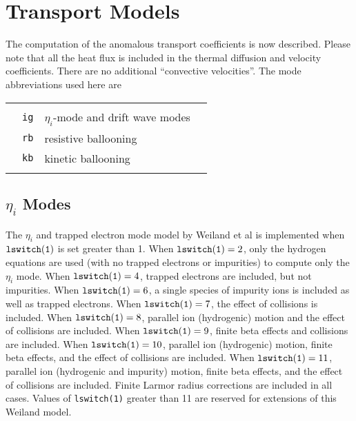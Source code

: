 
\section{Transport Models}

The computation of the anomalous transport coefficients is
now described.  Please note that all the heat flux is included in the
thermal diffusion and velocity coefficients.  There are no additional
``convective velocities''.
The mode abbreviations used here are
\begin{center}
\begin{tabular}{llll}
    &             &                                         &        \\
    & {\tt ig}    & $\eta_i$-mode and drift wave modes      &        \\
    & {\tt rb}    & resistive ballooning                    &        \\
    & {\tt kb}    & kinetic ballooning                      &        \\
    &             &                                         &
\end{tabular}
\end{center}


\subsection{$\eta_i$ Modes}

The $\eta_i$ and trapped electron mode model
by Weiland et al\cite{nord90a} is implemented when
${\tt lswitch(1)}$ is set greater than 1.
When $ {\tt lswitch(1)} = 2 $, only the hydrogen equations are used
(with no trapped electrons or impurities) to compute only the
$ \eta_i $ mode.
When $ {\tt lswitch(1)} = 4 $, trapped electrons are included,
but not impurities.
When $ {\tt lswitch(1)} = 6 $, a single species of impurity ions is
included as well as trapped electrons.
When $ {\tt lswitch(1)} = 7 $, the effect of collisions is included.
When $ {\tt lswitch(1)} = 8 $, parallel ion (hydrogenic) motion and
the effect of collisions are included.
When $ {\tt lswitch(1)} = 9 $, finite beta effects and collisions are
included.
When $ {\tt lswitch(1)} = 10 $, parallel ion (hydrogenic) motion,
finite beta effects, and the effect of collisions are included.
When $ {\tt lswitch(1)} = 11 $, parallel ion (hydrogenic and impurity) motion,
finite beta effects, and the effect of collisions are included.
Finite Larmor radius corrections are included in all cases.
Values of {\tt lswitch(1)} greater than 11 are reserved for extensions
of this Weiland model.

